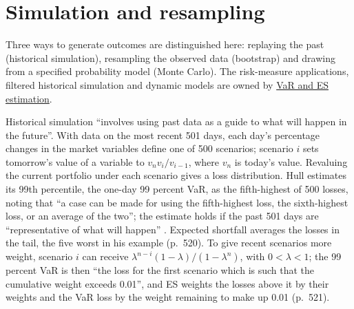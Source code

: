 \section{Simulation and resampling}

Three ways to generate outcomes are distinguished here: replaying the past (historical simulation), resampling the observed data (bootstrap) and drawing from a specified probability model (Monte Carlo). The risk-measure applications, filtered historical simulation and dynamic models are owned by \hyperref[meth:var-es-estimation-methods]{VaR and ES estimation}.

\begin{qfmethod}\label{meth:historical-simulation}
 Historical simulation ``involves using past data as a guide to what will happen in the future''. With data on the most recent 501 days, each day's percentage changes in the market variables define one of 500 scenarios; scenario $i$ sets tomorrow's value of a variable to $v_n v_i/v_{i-1}$, where $v_n$ is today's value. Revaluing the current portfolio under each scenario gives a loss distribution. Hull estimates its 99th percentile, the one-day 99 percent VaR, as the fifth-highest of 500 losses, noting that ``a case can be made for using the fifth-highest loss, the sixth-highest loss, or an average of the two''; the estimate holds if the past 501 days are ``representative of what will happen'' \citep[chap.~22, sec.~22.2, p.~517 and n.~2]{s7-hulloptions}. Expected shortfall averages the losses in the tail, the five worst in his example (p.~520). To give recent scenarios more weight, scenario $i$ can receive $\lambda^{n-i}(1-\lambda)/(1-\lambda^n)$, with $0<\lambda<1$; the 99 percent VaR is then ``the loss for the first scenario which is such that the cumulative weight exceeds 0.01'', and ES weights the losses above it by their weights and the VaR loss by the weight remaining to make up 0.01 (p.~521).


\end{qfmethod}
